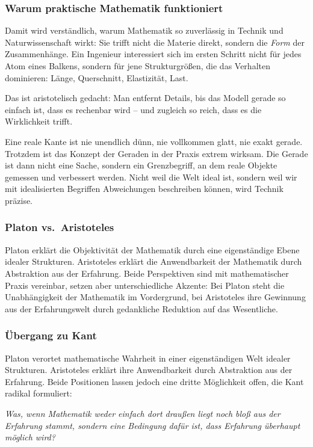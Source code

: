 \subsubsection*{Warum praktische Mathematik funktioniert}

Damit wird verständlich,
warum Mathematik so zuverlässig in Technik und Naturwissenschaft wirkt:
Sie trifft nicht die Materie direkt,
sondern die \emph{Form} der Zusammenhänge.
Ein Ingenieur interessiert sich im ersten Schritt nicht für jedes Atom eines Balkens,
sondern für jene Strukturgrößen,
die das Verhalten dominieren:
Länge,
Querschnitt,
Elastizität,
Last.

Das ist aristotelisch gedacht:
Man entfernt Details,
bis das Modell gerade so einfach ist,
dass es rechenbar wird --
und zugleich so reich,
dass es die Wirklichkeit trifft.

Eine reale Kante ist nie unendlich dünn,
nie vollkommen glatt,
nie exakt gerade.
Trotzdem ist das Konzept der Geraden in der Praxis extrem wirksam.
Die Gerade ist dann nicht eine Sache,
sondern ein Grenzbegriff,
an dem reale Objekte gemessen und verbessert werden.
Nicht weil die Welt ideal ist,
sondern weil wir mit idealisierten Begriffen Abweichungen beschreiben können,
wird Technik präzise.

\subsubsection*{Platon vs.\ Aristoteles}

Platon erklärt die Objektivität der Mathematik
durch eine eigenständige Ebene idealer Strukturen.
Aristoteles erklärt die Anwendbarkeit der Mathematik
durch Abstraktion aus der Erfahrung.
Beide Perspektiven sind mit mathematischer Praxis vereinbar,
setzen aber unterschiedliche Akzente:
Bei Platon steht die Unabhängigkeit der Mathematik im Vordergrund,
bei Aristoteles ihre Gewinnung aus der Erfahrungswelt
durch gedankliche Reduktion auf das Wesentliche.

\subsubsection*{Übergang zu Kant}

Platon verortet mathematische Wahrheit
in einer eigenständigen Welt idealer Strukturen.
Aristoteles erklärt ihre Anwendbarkeit
durch Abstraktion aus der Erfahrung.
Beide Positionen lassen jedoch eine dritte Möglichkeit offen,
die Kant radikal formuliert:

\medskip
\noindent
\emph{Was, wenn Mathematik weder einfach dort draußen liegt
	noch bloß aus der Erfahrung stammt,
	sondern eine Bedingung dafür ist,
	dass Erfahrung überhaupt möglich wird?}

